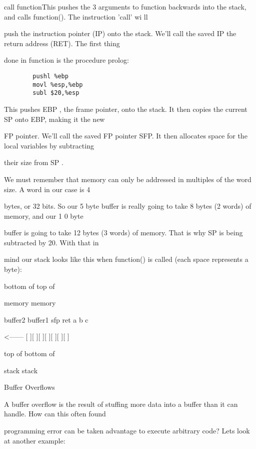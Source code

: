 \documentclass[10pt]{article}
\begin{document}
        call functionThis pushes the 3 arguments to function backwards into the stack, and calls function(). The instruction 'call' wi ll 

push the instruction pointer (IP) onto the stack. We'll call the saved IP the return address (RET).  The first thing 

done in function is the procedure prolog:

\begin{lstlisting}
        pushl %ebp
        movl %esp,%ebp
        subl $20,%esp
\end{lstlisting}

This pushes EBP , the frame pointer, onto the stack.  It then copies the current SP onto EBP, making it the new 

FP pointer.  We'll call the saved FP pointer SFP.  It then allocates space for the local variables by subtracting 

their size from SP .

We must remember that memory can only be addressed in multiples of the word size.   A word in our case is 4 

bytes, or 32 bits.  So our 5 byte buffer is really going to take 8 bytes (2 words) of memory, and our 1 0 byte 

buffer is going to take 12 bytes (3 words) of memory.  That is why SP is being subtracted by 20.  With that in 

mind our stack looks like this when function() is called  (each space represents a byte):

bottom of                                                            top of

memory                                                               memory

           buffer2       buffer1   sfp   ret   a     b     c

<------   [            ][        ][    ][    ][    ][    ][    ]

           

top of                                                            bottom of

stack                                                                 stack

Buffer Overflows

A buffer overflow is the result of stuffing more data into a buffer than it can handle. How can this often found 

programming error can be taken advantage to execute arbitrary code? Lets look at another example:
\end{document}
